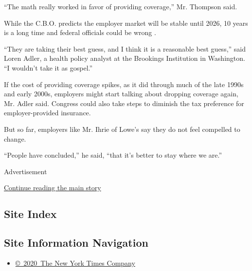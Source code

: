 ``The math really worked in favor of providing coverage,'' Mr. Thompson
said.

While the C.B.O. predicts the employer market will be stable until 2026,
10 years is a long time and federal officials could be wrong .

``They are taking their best guess, and I think it is a reasonable best
guess,'' said Loren Adler, a health policy analyst at the Brookings
Institution in Washington. ``I wouldn't take it as gospel.''

If the cost of providing coverage spikes, as it did through much of the
late 1990s and early 2000s, employers might start talking about dropping
coverage again, Mr. Adler said. Congress could also take steps to
diminish the tax preference for employer-provided insurance.

But so far, employers like Mr. Ihrie of Lowe's say they do not feel
compelled to change.

``People have concluded,'' he said, ``that it's better to stay where we
are.''

Advertisement

\protect\hyperlink{after-bottom}{Continue reading the main story}

\hypertarget{site-index}{%
\subsection{Site Index}\label{site-index}}

\hypertarget{site-information-navigation}{%
\subsection{Site Information
Navigation}\label{site-information-navigation}}

\begin{itemize}
\tightlist
\item
  \href{https://help.nytimes.com/hc/en-us/articles/115014792127-Copyright-notice}{©~2020~The
  New York Times Company}
\end{itemize}

